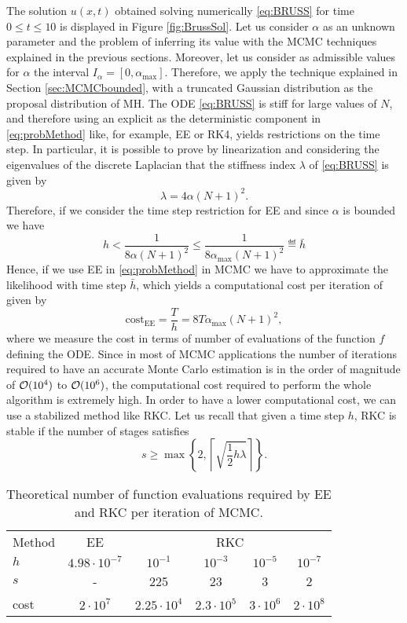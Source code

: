 The solution $u(x, t)$ obtained solving numerically \eqref{eq:BRUSS} for time $0 \leq t \leq 10$ is displayed in Figure \ref{fig:BrussSol}. Let us consider $\alpha$ as an unknown parameter and the problem of inferring its value with the MCMC techniques explained in the previous sections. Moreover, let us consider as admissible values for $\alpha$ the interval $I_\alpha = [0, \alpha_{\max}]$. Therefore, we apply the technique explained in Section \ref{sec:MCMCbounded}, with a truncated Gaussian distribution as the proposal distribution of MH. The ODE \eqref{eq:BRUSS} is stiff for large values of $N$, and therefore using an explicit as the deterministic component in \eqref{eq:probMethod} like, for example, EE or RK4, yields restrictions on the time step. In particular, it is possible to prove by linearization and considering the eigenvalues of the discrete Laplacian that the stiffness index $\lambda$ of \eqref{eq:BRUSS} is given by
\begin{equation}
	\lambda = 4 \alpha (N+1)^2.
\end{equation}
\noindent Therefore, if we consider the time step restriction for EE and since $\alpha$ is bounded we have
\begin{equation}
	h < \frac{1}{8\alpha(N+1)^2} \leq \frac{1}{8\alpha_{\max}(N+1)^2} \eqdef \bar h 
\end{equation} 
Hence, if we use EE in \eqref{eq:probMethod} in MCMC we have to approximate the likelihood with time step $\bar h$, which yields a computational cost per iteration of given by
\begin{equation}
	\mathrm{cost}_{\mathrm{EE}} = \frac{T}{h} = 8T \alpha_{\max}(N+1)^2,
\end{equation}
where we measure the cost in terms of number of evaluations of the function $f$ defining the ODE. Since in most of MCMC applications the number of iterations required to have an accurate Monte Carlo estimation is in the order of magnitude of $\mathcal{O}(10^4)$ to $\mathcal{O}(10^6)$, the computational cost required to perform the whole algorithm is extremely high. In order to have a lower computational cost, we can use a stabilized method like RKC. Let us recall that given a time step $h$, RKC is stable if the number of stages satisfies
\begin{equation}
	s \geq \max\left\{2, \left\lceil\sqrt{\frac{1}{2}h\lambda}\right\rceil \right\}.
\end{equation}
\begin{table}[t]
	\centering
	\begin{tabular}{lccccc}
		\toprule
		Method & EE & \multicolumn{4}{c}{RKC} \\ 
		\cmidrule{3-6}
		$h$ & $4.98\cdot 10^{-7}$ & $10^{-1}$ & $10^{-3}$ & $10^{-5}$ & $10^{-7}$   \\
		$s$ & - & 225 & 23 & 3 & 2 \\
		cost & $2 \cdot 10^{7}$ & $2.25 \cdot 10^{4}$ & $2.3 \cdot 10^{5}$ & $3 \cdot 10^{6}$  & $2 \cdot 10^{8}$ \\
		\bottomrule
	\end{tabular}
	\caption{Theoretical number of function evaluations required by EE and RKC per iteration of MCMC. }
	\label{tab:EEvsRKC}
\end{table}
